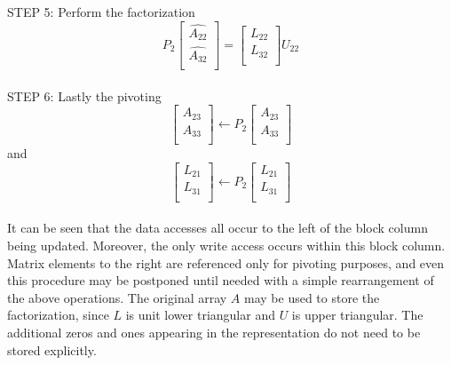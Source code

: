 STEP 5: Perform the factorization
\begin{equation}
P_{2}
\left[\begin{array}{l}
\hat{A_{22}} \\
\hat{A_{32}} \\
\end{array}\right] =
\left[\begin{array}{l}
L_{22} \\
L_{32}\\
\end{array}\right] U_{22}
\end{equation}\\
STEP 6: Lastly the pivoting
\begin{equation}
\left[\begin{array}{l}
A_{23} \\
A_{33} \\
\end{array}\right] \leftarrow
P_{2}
\left[\begin{array}{l}
A_{23} \\
A_{33}\\
\end{array}\right]
\end{equation}
and
\begin{equation}
\left[\begin{array}{l}
L_{21} \\
L_{31} \\
\end{array}\right] \leftarrow
P_{2}
\left[\begin{array}{l}
L_{21}\\
L_{31}\\
\end{array}\right]
\end{equation}\\
It can be seen that the data accesses all occur to the left of the block column being updated. Moreover, the only write access occurs within this block column.
Matrix elements to the right are referenced only for pivoting purposes, and even this procedure may be postponed until needed with a simple rearrangement of
the above operations. The original array $A$ may be used to store the factorization, since $L$ is unit lower triangular and $U$ is upper triangular. The
additional zeros and ones appearing in the representation do not need to be stored explicitly.

